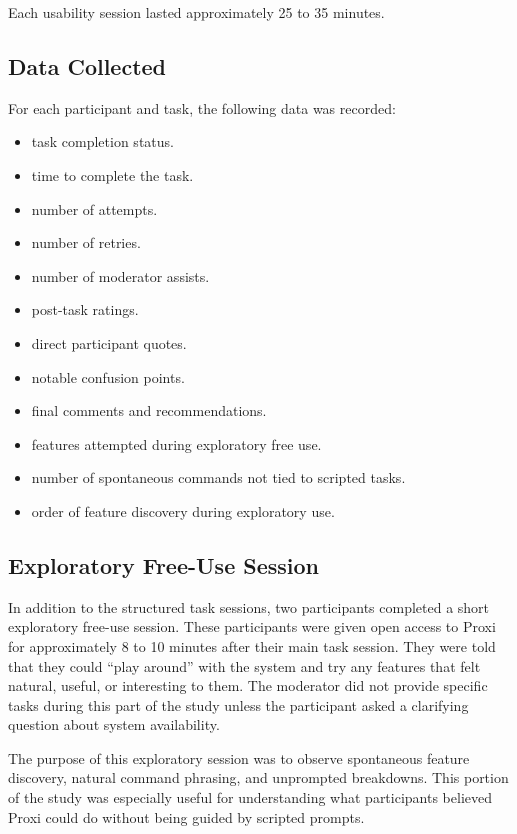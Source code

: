 \documentclass[12pt, titlepage]{article}
\begin{document}
Each usability session lasted approximately 25 to 35 minutes.

\subsection{Data Collected}

For each participant and task, the following data was recorded:
\begin{itemize}
    \item task completion status.
    \item time to complete the task.
    \item number of attempts.
    \item number of retries.
    \item number of moderator assists.
    \item post-task ratings.
    \item direct participant quotes.
    \item notable confusion points.
    \item final comments and recommendations.
    \item features attempted during exploratory free use.
    \item number of spontaneous commands not tied to scripted tasks.
    \item order of feature discovery during exploratory use.
\end{itemize}

\subsection{Exploratory Free-Use Session}

In addition to the structured task sessions, two participants completed
a short exploratory free-use session. These participants were given open
access to Proxi for approximately 8 to 10 minutes after their main task
session. They were told that they could ``play around'' with the system
and try any features that felt natural, useful, or interesting to them.
The moderator did not provide specific tasks during this part of the
study unless the participant asked a clarifying question about system
availability.

The purpose of this exploratory session was to observe spontaneous
feature discovery, natural command phrasing, and unprompted breakdowns.
This portion of the study was especially useful for understanding what
participants believed Proxi could do without being guided by scripted
prompts.
\end{document}
